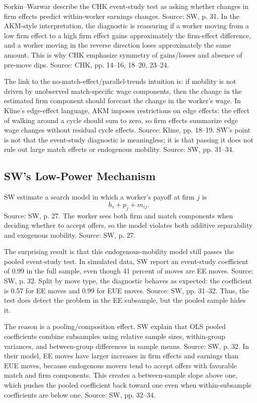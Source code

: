 \documentclass[11pt]{article}
\begin{document}
Sorkin--Warwar describe the CHK event-study test as asking whether changes in
firm effects predict within-worker earnings changes. Source: SW, p. 31. In the
AKM-style interpretation, the diagnostic is reassuring if a worker moving from a
low firm effect to a high firm effect gains approximately the firm-effect difference,
and a worker moving in the reverse direction loses approximately the same amount.
This is why CHK emphasize symmetry of gains/losses and absence of pre-move dips.
Source: CHK, pp. 14--16, 18--20, 23--24.

The link to the no-match-effect/parallel-trends intuition is: if mobility is not
driven by unobserved match-specific wage components, then the change in the
estimated firm component should forecast the change in the worker's wage. In
Kline's edge-effect language, AKM imposes restrictions on edge effects: the effect of
walking around a cycle should sum to zero, so firm effects summarize edge wage
changes without residual cycle effects. Source: Kline, pp. 18--19. SW's point is not
that the event-study diagnostic is meaningless; it is that passing it does not rule out
large match effects or endogenous mobility. Source: SW, pp. 31--34.

\subsection{SW's Low-Power Mechanism}

SW estimate a search model in which a worker's payoff at firm $j$ is
\[
h_i+p_j+m_{ij}.
\]
Source: SW, p. 27. The worker sees both firm and match components when deciding
whether to accept offers, so the model violates both additive separability and
exogenous mobility. Source: SW, p. 27.

The surprising result is that this endogenous-mobility model still passes the
pooled event-study test. In simulated data, SW report an event-study coefficient of
0.99 in the full sample, even though 41 percent of moves are EE moves. Source: SW,
p. 32. Split by move type, the diagnostic behaves as expected: the coefficient is
0.57 for EE moves and 0.99 for EUE moves. Source: SW, pp. 31--32. Thus, the test
does detect the problem in the EE subsample, but the pooled sample hides it.

The reason is a pooling/composition effect. SW explain that OLS pooled coefficients
combine subsamples using relative sample sizes, within-group variances, and
between-group differences in sample means. Source: SW, p. 32. In their model, EE
moves have larger increases in firm effects and earnings than EUE moves, because
endogenous movers tend to accept offers with favorable match and firm components.
This creates a between-sample slope above one, which pushes the pooled coefficient
back toward one even when within-subsample coefficients are below one. Source: SW,
pp. 32--34.
\end{document}
